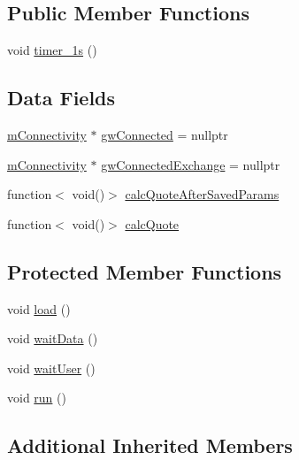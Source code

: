 \subsection*{Public Member Functions}
\begin{DoxyCompactItemize}
\item 
void \hyperlink{class_k_1_1_q_e_ab13c95e3802af839eab18d5e6e11aa8e}{timer\+\_\+1s} ()
\end{DoxyCompactItemize}
\subsection*{Data Fields}
\begin{DoxyCompactItemize}
\item 
\hyperlink{namespace_k_a3da250819294c55d5728586148bfa19e}{m\+Connectivity} $\ast$ \hyperlink{class_k_1_1_q_e_a572945fdb3d861b6c685f6c5af9f1376}{gw\+Connected} = nullptr
\item 
\hyperlink{namespace_k_a3da250819294c55d5728586148bfa19e}{m\+Connectivity} $\ast$ \hyperlink{class_k_1_1_q_e_a6d9ed4a9793ac810eca371568ee912d3}{gw\+Connected\+Exchange} = nullptr
\item 
function$<$ void()$>$ \hyperlink{class_k_1_1_q_e_ad94592f5065d0e45c53b88f97036639a}{calc\+Quote\+After\+Saved\+Params}
\item 
function$<$ void()$>$ \hyperlink{class_k_1_1_q_e_a7fa74fffe521ea33c7a4c9deaa606994}{calc\+Quote}
\end{DoxyCompactItemize}
\subsection*{Protected Member Functions}
\begin{DoxyCompactItemize}
\item 
void \hyperlink{class_k_1_1_q_e_a78f61ac2dd03bcba8e09ca20cd7d68e3}{load} ()
\item 
void \hyperlink{class_k_1_1_q_e_aa9a0f090ee360e2a9f967200d30f4a22}{wait\+Data} ()
\item 
void \hyperlink{class_k_1_1_q_e_aa3f7b56799f5915cfbc902f6426c2bb2}{wait\+User} ()
\item 
void \hyperlink{class_k_1_1_q_e_a13a43e6d814de94978c515cb084873b1}{run} ()
\end{DoxyCompactItemize}
\subsection*{Additional Inherited Members}


